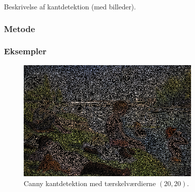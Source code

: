 {
Beskrivelse af kantdetektion (med billeder).

\subsubsection*{Metode}

\subsubsection*{Eksempler}

\begin{figure}[!h]
    \begin{center}
        \includegraphics[width=0.8\textwidth]{afsnit/vores_implementation/billeder/kantdetektion/canny_20_20}
    \end{center}
    \caption[]{Canny kantdetektion med tærskelværdierne $(20, 20)$.}
    \label{bathers}
\end{figure}
}

